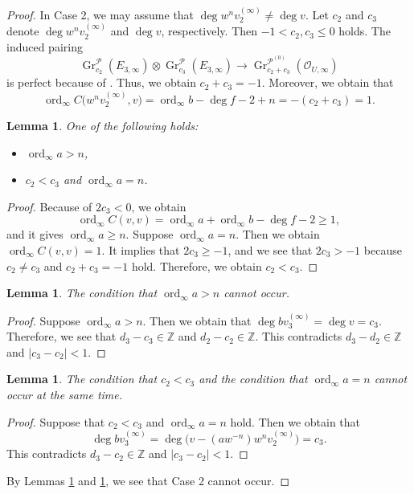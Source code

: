\documentclass[pdftex]{sigma}
\numberwithin{equation}{section}
\newtheorem{Lemma}[Theorem]{Lemma}
\newcommand{\Z}{\mathbb{Z}}
\newcommand{\ord}{\operatorname{ord}}
\newcommand{\strsheaf}{\mathcal{O}}
\newcommand{\gr}{\operatorname{\mathrm{Gr}}}
\begin{document}
\begin{proof}
In Case 2, we may assume that $\deg{w^{n}v^{(\infty)}_2} \neq \deg{v}$. Let $c_2$ and $c_3$ denote $\deg{w^{n}v^{(\infty)}_2}$ and $\deg{v}$, respectively. Then $-1<c_2,c_3\leq 0$ holds. The induced pairing
 \begin{equation*}
 \gr^{\mathcal{P}}_{c_2} (E_{3,\infty})\otimes \gr^{\mathcal{P}}_{c_3} (E_{3,\infty}) \to \gr^{\mathcal{P}^{(0)}}_{c_2+c_3} (\strsheaf_{U,\infty})
 \end{equation*}
 is perfect because of . Thus, we obtain $c_2 + c_3= -1$. Moreover, we obtain that
 \begin{equation*}
 \ord_{\infty}C\big(w^n v^{(\infty)}_2,v\big) = \ord_{\infty} b - \deg{f}-2 + n = -(c_2+c_3) = 1.
 \end{equation*}
 \begin{Lemma}
 One of the following holds:
 \begin{itemize}\itemsep=0pt
 \item $\ord_{\infty} a > n$,
 \item $c_2 < c_3$ and $\ord_{\infty} a=n$.
 \end{itemize}
 \end{Lemma}
 \begin{proof}
 Because of $2c_3 < 0$, we obtain
 \begin{equation*}
 \ord_{\infty}C(v,v) = \ord_{\infty}a+\ord_{\infty}b-\deg{f}-2 \geq 1,
 \end{equation*}
 and it gives $\ord_{\infty} a\geq n$. Suppose $\ord_{\infty}a=n$. Then we obtain $\ord_{\infty}C(v,v)=1$. It implies that $2c_3\geq-1$, and we see that $2c_3>-1$ because $c_2\neq c_3$ and $c_2+c_3=-1$ hold. Therefore, we obtain $c_2 < c_3$.
 \end{proof}

 \begin{Lemma}\label{cannot_occur1}
 The condition that $\ord_{\infty} a > n$ cannot occur.
 \end{Lemma}
 \begin{proof}
 Suppose $\ord_{\infty} a > n$. Then we obtain that $\deg{bv^{(\infty)}_3} = \deg{v} = c_3$. Therefore, we see that $d_3-c_3\in \Z$ and $d_2-c_2\in \Z$. This contradicts $d_3-d_2\in\Z$ and $|c_3-c_2|<1$.
 \end{proof}

 \begin{Lemma}\label{cannot_occur2}
 The condition that $c_2 < c_3$ and the condition that $\ord_{\infty} a=n$ cannot occur at the same time.
 \end{Lemma}
 \begin{proof}
 Suppose that $c_2 < c_3$ and $\ord_{\infty} a=n$ hold. Then we obtain that
 \[
 \deg{bv^{(\infty)}_3} = \deg{\big(v-(aw^{-n})w^n v^{(\infty)}_2\big)} = c_3.
 \]
 This contradicts $d_3-c_2\in \Z$ and $|c_3-c_2|<1$.
 \end{proof}
 By Lemmas \ref{cannot_occur1} and \ref{cannot_occur2}, we see that Case 2 cannot occur.
\end{proof}
\end{document}
